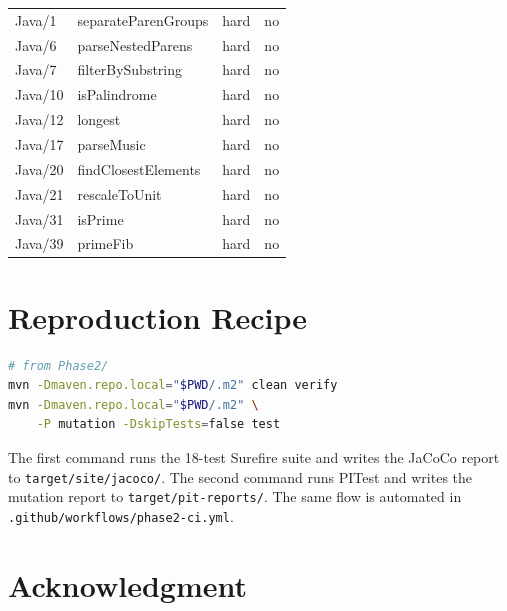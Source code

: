 \documentclass[journal]{IEEEtran}
\begin{document}
\begin{table}[!ht]
\begin{tabular}{@{}llll@{}}
\midrule
Java/1  & separateParenGroups  & hard & no \\
Java/6  & parseNestedParens    & hard & no \\
Java/7  & filterBySubstring    & hard & no \\
Java/10 & isPalindrome         & hard & no \\
Java/12 & longest              & hard & no \\
Java/17 & parseMusic           & hard & no \\
Java/20 & findClosestElements  & hard & no \\
Java/21 & rescaleToUnit        & hard & no \\
Java/31 & isPrime              & hard & no \\
Java/39 & primeFib             & hard & no \\
\bottomrule
\end{tabular}
\end{table}

\section{Reproduction Recipe}\label{app:repro}

\begin{lstlisting}[language=bash, caption=Reproducing the Phase 2 BookScan build and PITest report.]
# from Phase2/
mvn -Dmaven.repo.local="$PWD/.m2" clean verify
mvn -Dmaven.repo.local="$PWD/.m2" \
    -P mutation -DskipTests=false test
\end{lstlisting}

The first command runs the 18-test Surefire suite and writes the JaCoCo
report to \texttt{target/site/jacoco/}. The second command runs PITest
and writes the mutation report to \texttt{target/pit-reports/}. The same
flow is automated in \texttt{.github/workflows/phase2-ci.yml}.

\section*{Acknowledgment}
\end{document}

